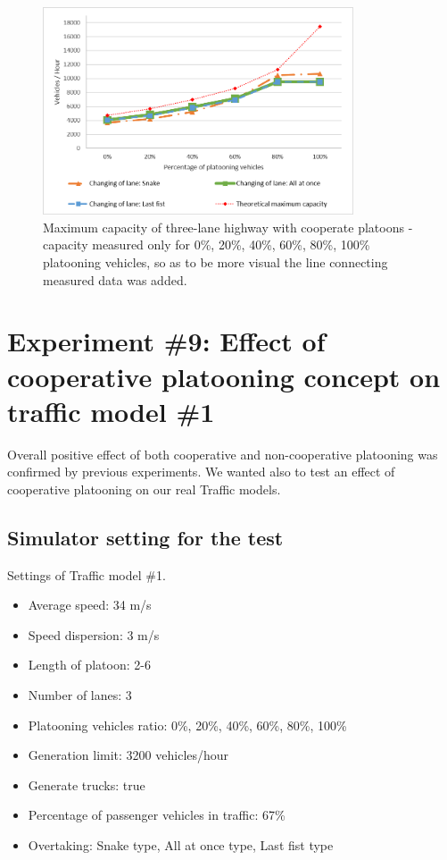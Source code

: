 \begin{figure}[!htbp]
\centering
\includegraphics[width=0.82\textwidth,height=0.82\textheight,keepaspectratio]{figures/Chapter_6/6_E2_maxCap.png}
\centering
\protect\caption[Maximum capacity of three-lane highway with cooperate platoons]{\label{fig:6_3_2-1}Maximum capacity of three-lane highway with cooperate platoons - capacity measured only for 0\%, 20\%, 40\%, 60\%, 80\%, 100\% platooning vehicles, so as to be more visual the line connecting measured data was added.}
\end{figure}










\newpage
\section[Experiment \#9: Effect of cooperative platooning concept on traffic model \#1]{Experiment \#9: Effect of cooperative platooning concept on traffic model \#1 }

Overall positive effect of both cooperative and non-cooperative platooning was confirmed by previous experiments. We wanted also to test an effect of cooperative platooning on our real Traffic models.

\subsection*{Simulator setting for the test}
Settings of Traffic model \#1.
\begin{itemize}
\item Average speed: 34 m/s
\item Speed dispersion: 3 m/s
\item Length of platoon: 2-6
\item Number of lanes:  3
\item Platooning vehicles ratio: 0\%, 20\%, 40\%, 60\%, 80\%, 100\%
\item Generation limit: 3200 vehicles/hour
\item Generate trucks: true
\item Percentage of passenger vehicles in traffic: 67\%
\item Overtaking: Snake type, All at once type, Last fist type
\end{itemize}


